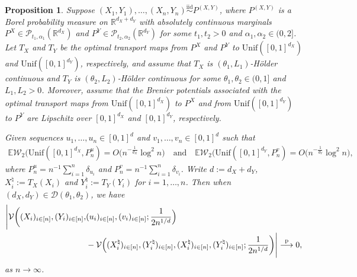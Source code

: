 \documentclass[11pt]{article}
\newtheorem{prop}[thm]{Proposition}
\begin{document}
\begin{prop}\label{prop: VonRawData_deterministic}
Suppose $(X_1, Y_1), \ldots, (X_n, Y_n) \stackrel{\mathrm{iid}}{\sim} P^{(X, Y)}$, where $P^{(X, Y)}$ is a Borel probability measure on $\mathbb{R}^{d_X+d_Y}$ with absolutely continuous marginals $P^X \in \mathcal{P}_{t_1, \alpha_1}(\mathbb{R}^{d_X})$ and $P^Y\in \mathcal{P}_{t_2, \alpha_2}(\mathbb{R}^{d_Y})$ for some $t_1, t_2 > 0$ and $\alpha_1, \alpha_2 \in (0, 2]$. Let $T_X$ and $T_Y$ be the optimal transport maps from $P^X$ and $P^Y$ to $\mathrm{Unif}([0, 1]^{d_X})$ and $\mathrm{Unif}([0, 1]^{d_Y})$, respectively, and assume that $T_X$ is $(\theta_1, L_1)$-H\"older continuous and $T_Y$ is $(\theta_2, L_2)$-H\"older continuous for some $\theta_1, \theta_2 \in (0, 1]$ and $L_1, L_2 >0$. Moreover, assume that the Brenier potentials associated with the optimal transport maps from $\mathrm{Unif}([0, 1]^{d_X})$ to $P^X$ and from $\mathrm{Unif}([0, 1]^{d_Y})$ to $P^Y$ are Lipschitz over $[0, 1]^{d_X}$ and $[0, 1]^{d_Y}$, respectively.

Given sequences $u_1, \ldots, u_n \in [0, 1]^d$ and $v_1, \ldots, v_n \in [0, 1]^d$ such that 
\begin{align}
\mathbb{E}\mathcal{W}_2\bigl(\mathrm{Unif}([0, 1]^{d_X}, P_n^u) = O(n^{-\frac{1}{d_X}}\log^2 n \bigr) \quad \text{and} \quad  \mathbb{E}\mathcal{W}_2\bigl(\mathrm{Unif}([0, 1]^{d_Y}, P_n^v) = O(n^{-\frac{1}{d_Y}}\log^2 n\bigr), \label{eq:QuasiUniformApproxRate}
\end{align}
where $P_n^u = n^{-1} \sum_{i = 1}^n \delta_{u_i}$ and $P_n^v = n^{-1} \sum_{i = 1}^n \delta_{v_i}$.  Write $d:= d_X + d_Y$, $X_i^\natural  := T_X(X_i)$ and $Y_i^\natural  := T_Y(Y_i)$ for $i = 1, \ldots, n$. Then when $(d_X, d_Y) \in \mathcal{D}(\theta_1, \theta_2)$, we have
\begin{align*}
    \Biggl|\mathcal{V}\biggl((X_i)_{i\in[n]}, (Y_i)_{i\in[n]}, &(u_i)_{i\in[n]},(v_i)_{i\in[n]}; \frac{1}{2n^{1/d}} \Bigr) \\
    &- \mathcal{V}\Bigl((X_i^\natural)_{i\in[n]}, (Y_i^\natural )_{i\in[n]}, ( X_i^\natural)_{i\in[n]}, ( Y_i^\natural )_{i\in[n]}; \frac{1}{2n^{1/d}}\biggr)\Biggr| \stackrel{\mathrm{p}}{\longrightarrow} 0,
\end{align*}
as $n \to \infty$.
\end{prop}
\end{document}
